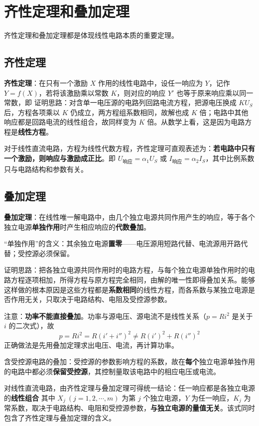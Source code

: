 \section{齐性定理和叠加定理}
齐性定理和叠加定理都是体现线性电路本质的重要定理。

\subsection{齐性定理}
\textbf{齐性定理}：在只有一个激励 $X$ 作用的线性电路中，设任一响应为 $Y$，记作 $Y=f(X)$，若将该激励乘以常数 $K$，则对应的响应 $Y'$ 也等于原来响应乘以同一常数，即
证明思路：对含单一电压源的电路列回路电流方程，把源电压换成 $KU_S$ 后，方程各项乘以 $K$ 仍成立，两方程组系数相同，故解也成 $K$ 倍；电路中其他响应都是回路电流的线性组合，故同样变为 $K$ 倍。从数学上看，这是因为电路方程是\textbf{线性方程}。

对于线性直流电路，方程为线性代数方程，齐性定理可直观表述为：\textbf{若电路中只有一个激励，则响应与激励成正比}。即 $U_{\text{响应}}=\alpha_1U_S$ 或 $I_{\text{响应}}=\alpha_2I_S$，其中比例系数只与电路结构和参数有关。

\subsection{叠加定理}
\textbf{叠加定理}：在线性唯一解电路中，由几个独立电源共同作用产生的响应，等于各个独立电源\textbf{单独作用}时产生相应响应的\textbf{代数叠加}。

“单独作用”的含义：其余独立电源\textbf{置零}——电压源用短路代替、电流源用开路代替；受控源必须保留。

证明思路：把各独立电源共同作用时的电路方程，与每个独立电源单独作用时的电路方程逐项相加，所得方程与原方程完全相同，由解的唯一性即得叠加关系。能够这样做的根本原因是这些方程都是\textbf{系数相同}的线性方程，而各系数与某独立电源是否作用无关，只取决于电路结构、电阻及受控源参数。

注意：\textbf{功率不能直接叠加}。功率与源电压、源电流不是线性关系（$p=Ri^2$ 是关于 $i$ 的二次式），故
\begin{equation}
p=Ri^{2}=R\left(i'+i''\right)^{2}\neq R(i')^{2}+R(i'')^{2}
\end{equation}
正确做法是先用叠加定理求出电压、电流，再计算功率。

含受控源电路的叠加：受控源的参数影响方程的系数，故在\textbf{每个}独立电源单独作用的电路中都必须\textbf{保留受控源}，其控制量取该电路中的相应电压或电流。

对线性直流电路，由齐性定理与叠加定理可得统一结论：任一响应都是各独立电源的\textbf{线性组合}
其中 $X_j\ (j=1,2,\cdots,m)$ 为第 $j$ 个独立电源，$Y$ 为任一响应，$K_j$ 为常系数，取决于电路结构、电阻和受控源参数，\textbf{与独立电源的量值无关}。该式同时包含了齐性定理与叠加定理的含义。

